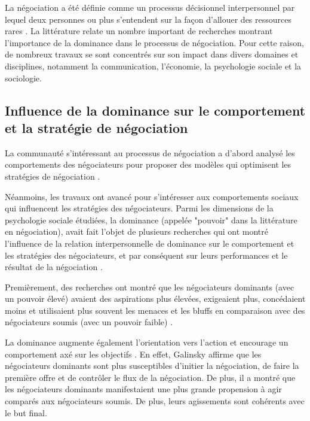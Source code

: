 		La négociation a été définie comme un processus décisionnel interpersonnel par lequel deux personnes ou plus s'entendent sur la façon d'allouer des ressources rares \cite{thompson2000mind}. La littérature  relate un nombre important de recherches \cite{de1995impact,van2006power,fiske1993controlling} montrant l'importance de la dominance dans le processus de négociation. Pour cette raison, de nombreux travaux se sont concentrés sur son impact dans divers domaines et disciplines, notamment la communication, l'économie, la psychologie sociale et la sociologie.
		
		\subsection{Influence de la dominance sur le comportement et la stratégie de négociation}
		
		La communauté s'intéressant au processus de négociation a d'abord analysé les comportements des négociateurs pour proposer des modèles qui optimisent les stratégies de négociation \cite{thompson2010negotiation}.
		
		Néanmoins, les travaux ont avancé pour s'intéresser aux comportements sociaux qui influencent les stratégies des négociateurs. Parmi les dimensions de la psychologie sociale étudiées, la dominance  (appelée "pouvoir" dans la littérature en négociation), avait fait l'objet de plusieurs recherches qui ont montré l'influence  de la relation interpersonnelle de dominance sur le comportement et les stratégies des négociateurs, et par conséquent sur leurs performances et le résultat de la négociation \cite{de1995impact,van2006power}.
		
		Premièrement, des recherches ont montré que les négociateurs dominants (avec un pouvoir élevé) avaient des aspirations plus élevées, exigeaient plus, concédaient moins et utilisaient plus souvent les menaces et les bluffs en comparaison avec des négociateurs soumis (avec un pouvoir faible) \cite{de1995impact}.
		
		La dominance augmente également l'orientation vers l'action et encourage un comportement axé sur les objectifs \cite{van2006power}. En effet, Galinsky \cite{galinsky2003power} affirme que les négociateurs dominants sont plus susceptibles d'initier la négociation, de faire la première offre et de contrôler le flux de la négociation.  De plus, il a montré que les négociateurs dominants manifestaient une plus grande propension à agir comparés aux négociateurs soumis. De plus, leurs agissements sont cohérents avec le but final.
		
